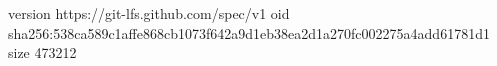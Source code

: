 version https://git-lfs.github.com/spec/v1
oid sha256:538ca589c1affe868cb1073f642a9d1eb38ea2d1a270fc002275a4add61781d1
size 473212
